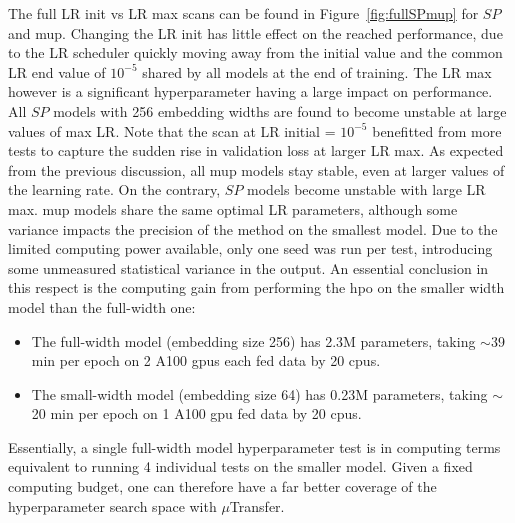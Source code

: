 The full LR init vs LR max scans can be found in Figure~\ref{fig:fullSPmup} for $SP$ and \gls{mup}. Changing the LR init has little effect on the reached performance, due to the LR scheduler quickly moving away from the initial value and the common LR end value of $10^{-5}$ shared by all models at the end of training. The LR max however is a significant hyperparameter having a large impact on performance. All $SP$ models with 256 embedding widths are found to become unstable at large values of max LR. Note that the scan at LR initial = $10^{-5}$ benefitted from more tests to capture the sudden rise in validation loss at larger LR max. As expected from the previous discussion, all \gls{mup} models stay stable, even at larger values of the learning rate. On the contrary, $SP$ models become unstable with large LR max. \gls{mup} models share the same optimal LR parameters, although some variance impacts the precision of the method on the smallest model. Due to the limited computing power available, only one seed was run per test, introducing some unmeasured statistical variance in the output. An essential conclusion in this respect is the computing gain from performing the \gls{hpo} on the smaller width model than the full-width one:
\begin{itemize}
  \item The full-width model (embedding size 256) has 2.3M parameters, taking $\sim$39 min per epoch on 2 A100 \glspl{gpu} each fed data by 20 \glspl{cpu}.
  \item The small-width model (embedding size 64) has 0.23M parameters, taking $\sim$20 min per epoch on 1 A100 \gls{gpu} fed data by 20 \glspl{cpu}.
\end{itemize}
Essentially, a single full-width model hyperparameter test is in computing terms equivalent to running 4 individual tests on the smaller model. Given a fixed computing budget, one can therefore have a far better coverage of the hyperparameter search space with $\mu$Transfer.\\

